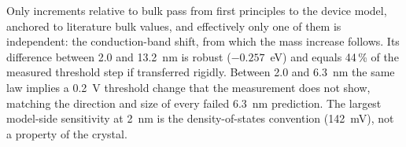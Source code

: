 \begin{keyresult}
Only increments relative to bulk pass from first principles to the device model, anchored to literature bulk values,
and effectively only one of them is independent: the conduction-band shift, from which the mass increase follows. Its
difference between 2.0 and 13.2~nm is robust ($-0.257$~eV) and equals 44\,\% of the measured threshold step if
transferred rigidly. Between 2.0 and 6.3~nm the same law implies a 0.2~V threshold change that the measurement does not
show, matching the direction and size of every failed 6.3~nm prediction. The largest model-side sensitivity at 2~nm is the
density-of-states convention (142~mV), not a property of the crystal.
\end{keyresult}
